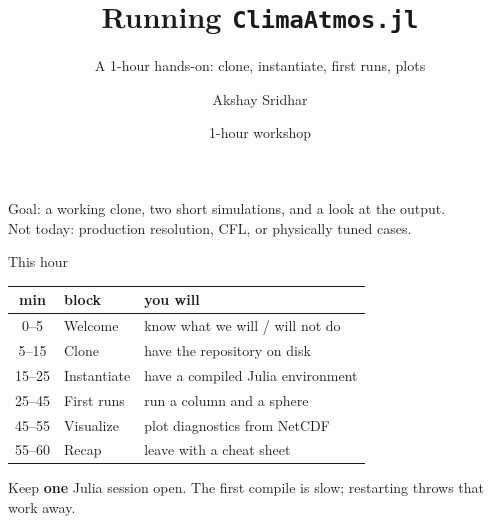 \documentclass[aspectratio=169,11pt]{beamer}
\title[ClimaAtmos tutorial]{Running \texttt{ClimaAtmos.jl}}
\subtitle{A 1-hour hands-on: clone, instantiate, first runs, plots}
\author{Akshay Sridhar}
\institute{Climate Modeling Alliance (CliMA)}
\date{1-hour workshop}
\begin{document}
\begin{frame}[plain]
  \titlepage
  \begin{center}\small
    Goal: a working clone, two short simulations, and a look at the output.\\
    Not today: production resolution, CFL, or physically tuned cases.
  \end{center}
\end{frame}

\begin{frame}{This hour}
\begin{center}
\begin{tabular}{clp{}}
  \toprule
  \textbf{min} & \textbf{block} & \textbf{you will} \\
  \midrule
  0--5   & Welcome        & know what we will / will not do \\
  5--15  & Clone          & have the repository on disk \\
  15--25 & Instantiate    & have a compiled Julia environment \\
  25--45 & First runs     & run a column and a sphere \\
  45--55 & Visualize      & plot diagnostics from NetCDF \\
  55--60 & Recap          & leave with a cheat sheet \\
  \bottomrule
\end{tabular}
\end{center}
\vspace{0.6em}
\small
Keep \textbf{one} Julia session open. The first compile is slow; restarting
throws that work away.
\end{frame}
\end{document}

